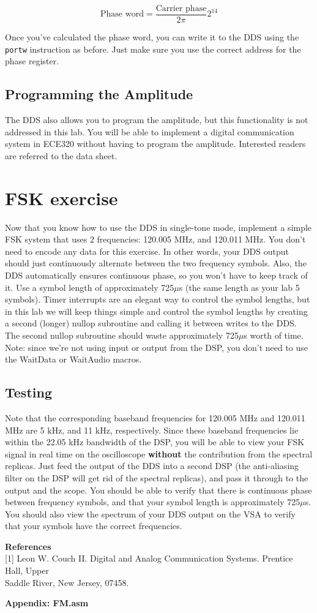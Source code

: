 \begin{equation}
\mbox{Phase word} =\frac{\mbox{Carrier phase}}{2\pi}2^{14}
\end{equation}

Once you've calculated the phase word, you can write it to the DDS using the \verb+portw+ 
instruction as before.  Just make sure you use the correct address for the phase register.

\subsection{Programming the Amplitude}  
The DDS also allows you to program the amplitude, but this functionality is not addressed 
in this lab.  You will be able to implement a digital communication system in ECE320 
without having to program the amplitude.  Interested readers are referred to the data sheet.

\section{FSK exercise}
Now that you know how to use the DDS in single-tone mode, implement a simple FSK system that 
uses 2 frequencies: 120.005 MHz, and 120.011 MHz.  You don't need to encode any data for this 
exercise.  In other words, your DDS output should just continuously alternate between the two 
frequency symbols.  Also, the DDS automatically ensures continuous phase, so you won't have to 
keep track of it.  Use a symbol length of approximately 725$\mu$s (the same length as your lab 5 
symbols).  Timer interrupts are an elegant way to control the symbol lengths, but in this lab
 we will keep things simple and control the symbol lengths by creating a second (longer) nullop 
subroutine and calling it between writes to the DDS.  The second nullop subroutine should waste 
approximately 725$\mu$s worth of time.  Note: since we're not using input or output from the DSP, 
you don't need to use the WaitData or WaitAudio macros.  

\subsection{Testing}
Note that the corresponding baseband frequencies for 120.005 MHz and 120.011 MHz are 5 kHz, and 
11 kHz, respectively.  Since these baseband frequencies lie within the 22.05 kHz bandwidth of 
the DSP, you will be able to view your FSK signal in real time on the oscilloscope {\bf without} the 
contribution from the spectral replicas.  Just feed the output of the DDS into a second DSP (the anti-aliasing
filter on the DSP will get rid of the spectral replicas), and 
pass it through to the output and the scope.  You should be able to verify that there is continuous 
phase between frequency symbols, and that your symbol length is approximately 725$\mu$s.  You should 
also view the spectrum of your DDS output on the VSA to verify that your symbols have 
the correct frequencies.

\newpage
{\bf References} \\ 

[1] Leon W. Couch II. Digital and Analog Communication Systems.  Prentice Hall, Upper \\ 
Saddle River, New Jersey, 07458.

\newpage
{\bf Appendix: FM.asm}
\setlength{\baselineskip}{0.4cm}
\setlength{\baselineskip}{0.5cm}

